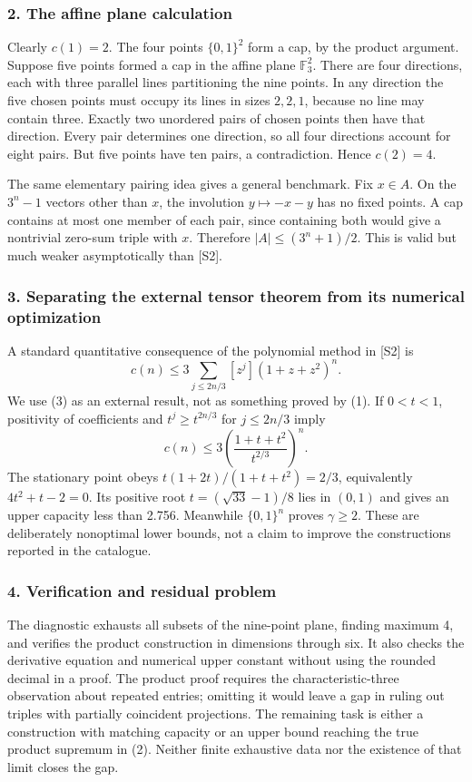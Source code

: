 \documentclass[11pt,a4paper]{article}
\begin{document}
\subsubsection{2. The affine plane calculation}
Clearly $c(1)=2$. The four points $\{0,1\}^2$ form a cap, by the product argument. Suppose five points formed a cap in the affine plane $\mathbb F_3^2$. There are four directions, each with three parallel lines partitioning the nine points. In any direction the five chosen points must occupy its lines in sizes $2,2,1$, because no line may contain three. Exactly two unordered pairs of chosen points then have that direction. Every pair determines one direction, so all four directions account for eight pairs. But five points have ten pairs, a contradiction. Hence $c(2)=4$.

The same elementary pairing idea gives a general benchmark. Fix $x\in A$. On the $3^n-1$ vectors other than $x$, the involution $y\mapsto -x-y$ has no fixed points. A cap contains at most one member of each pair, since containing both would give a nontrivial zero-sum triple with $x$. Therefore $|A|\leq(3^n+1)/2$. This is valid but much weaker asymptotically than [S2].

\subsubsection{3. Separating the external tensor theorem from its numerical optimization}
A standard quantitative consequence of the polynomial method in [S2] is
\[c(n)\leq3\sum_{j\leq2n/3}[z^j](1+z+z^2)^n.\tag{3}\]
We use (3) as an external result, not as something proved by (1). If $0<t<1$, positivity of coefficients and $t^j\geq t^{2n/3}$ for $j\leq2n/3$ imply
\[c(n)\leq3\left(\frac{1+t+t^2}{t^{2/3}}\right)^n.\]
The stationary point obeys $t(1+2t)/(1+t+t^2)=2/3$, equivalently $4t^2+t-2=0$. Its positive root $t=(\sqrt{33}-1)/8$ lies in $(0,1)$ and gives an upper capacity less than 2.756. Meanwhile $\{0,1\}^n$ proves $\gamma\geq2$. These are deliberately nonoptimal lower bounds, not a claim to improve the constructions reported in the catalogue.

\subsubsection{4. Verification and residual problem}
The diagnostic exhausts all subsets of the nine-point plane, finding maximum 4, and verifies the product construction in dimensions through six. It also checks the derivative equation and numerical upper constant without using the rounded decimal in a proof. The product proof requires the characteristic-three observation about repeated entries; omitting it would leave a gap in ruling out triples with partially coincident projections. The remaining task is either a construction with matching capacity or an upper bound reaching the true product supremum in (2). Neither finite exhaustive data nor the existence of that limit closes the gap.
\end{document}
